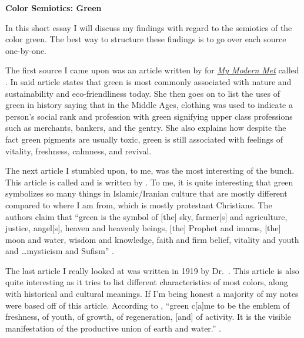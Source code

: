 \documentclass[12pt]{article}
\begin{document}
\begin{doublespace}
    \vspace*{20pt}
        \begin{center}
            \textbf{Color Semiotics: Green}
        \end{center}

        \par In this short essay I will discuss my findings with regard to the semiotics of the color green.
        The best way to structure these findings is to go over each source one-by-one.
        \par 
            The first source I came upon was an article written by \citeauthor{ModernMet} for \href{www.mymodernmet.com}{\textit{My Modern Met}} called . In said article \citeauthor*{ModernMet} states that green is most commonly associated with nature and sustainability and eco-friendliness today. 
            She then goes on to list the uses of green in history saying that in the Middle Ages, clothing was used to indicate a person's social rank and profession with green signifying upper class professions such as merchants, bankers, and the gentry.
            She also explains how despite the fact green pigments are usually toxic, green is still associated with feelings of vitality, freshness, calmness, and revival.
        \par
            The next article I stumbled upon, to me, was the most interesting of the bunch. This article is called  and is written by \citeauthor{Islam}.
            To me, it is quite interesting that green symbolizes so many things in Islamic/Iranian culture that are mostly different compared to where I am from, which is mostly protestant Christians. The authors claim that ``green is the symbol of [the] sky, farmer[s] and agriculture, justice, angel[s], heaven and heavenly beings, [the] Prophet and imams, [the] moon and water, wisdom and knowledge, faith and firm belief, vitality and youth and \dots mysticism and Sufism'' \autocite[26]{Islam}.
        \par 
            The last article I really looked at was  written in 1919 by Dr.\ \citeauthor{colorSymbolism}. 
            This article is also quite interesting as it tries to list different characteristics of most colors, along with historical and cultural meanings. If I'm being honest a majority of my notes were based off of this article. 
            According to \citeauthor*{colorSymbolism}, ``green c[a]me to be the emblem of freshness, of youth, of growth, of regeneration, [and] of activity. It is the visible manifestation of the productive union of earth and water.'' \autocite[139-140]{colorSymbolism}.

\end{doublespace}
\end{document}
